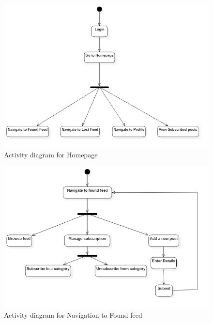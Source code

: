 \documentclass[a4paper,12pt]{article}
\begin{document}
{\begin{figure}[h!]
  \includegraphics[width=1\textwidth]{activity2}
  \caption{Activity diagram for Homepage}
\end{figure}
\begin{figure}[h!]
  \includegraphics[width=1\textwidth]{activity3}
  \caption{Activity diagram for Navigation to Found feed}
\end{figure}
\begin{figure}[h!]

\end{figure}}
\end{document}
